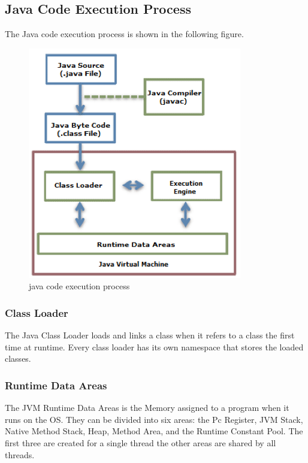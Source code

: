\subsection{Java Code Execution Process} 
The Java code execution process is shown in the following figure. 
\begin{figure}[H]
\centering
\includegraphics[width=\textwidth,height=\textheight,keepaspectratio]{graphics/java-code-execution-process.png}
\caption{java code execution process \cite{javaJVM}}
\end{figure}
\subsubsection{Class Loader}
The Java Class Loader loads and links a class when it refers to a class the first time at runtime. Every class loader has its own namespace that stores the loaded classes.\cite{javaJVM} 

\subsubsection{Runtime Data Areas}
The JVM Runtime Data Areas is the Memory assigned to a program when it runs on the OS. They can be divided into six areas: the Pc Register, JVM Stack, Native Method Stack, Heap, Method Area, and the Runtime Constant Pool. The first three are created for a single thread the other areas are shared by all threads.  

